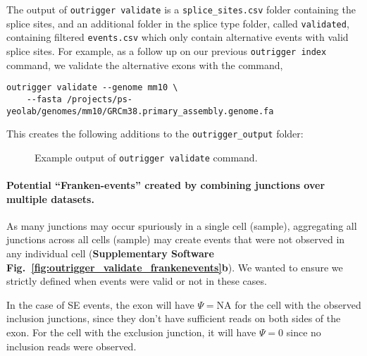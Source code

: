 The output of \texttt{outrigger validate} is a \texttt{splice\_sites.csv} folder containing the splice sites, and an additional folder in the splice type folder, called \texttt{validated}, containing filtered \texttt{events.csv} which only contain alternative events with valid splice sites. For example, as a follow up on our previous \texttt{outrigger index} command, we validate the alternative exons with the command,

\begin{verbatim}
outrigger validate --genome mm10 \
    --fasta /projects/ps-yeolab/genomes/mm10/GRCm38.primary_assembly.genome.fa
\end{verbatim}

This creates the following additions to the \texttt{outrigger\_output} folder:

\begin{figure}[H]
\caption{Example output of \texttt{outrigger validate} command.}
\end{figure}


\paragraph{Potential ``Franken-events'' created by combining junctions over multiple datasets.} As many junctions may occur spuriously in a single cell (sample), aggregating all junctions across all cells (sample) may create events that were not observed in any individual cell (\textbf{Supplementary Software Fig.~\ref{fig:outrigger_validate_frankenevents}b}). We wanted to ensure we strictly defined when events were valid or not in these cases.

In the case of SE events, the exon will have $\Psi = \text{NA}$ for the cell with the observed inclusion junctions, since they don't have sufficient reads on both sides of the exon. For the cell with the exclusion junction, it will have $\Psi = 0$ since no inclusion reads were observed.

